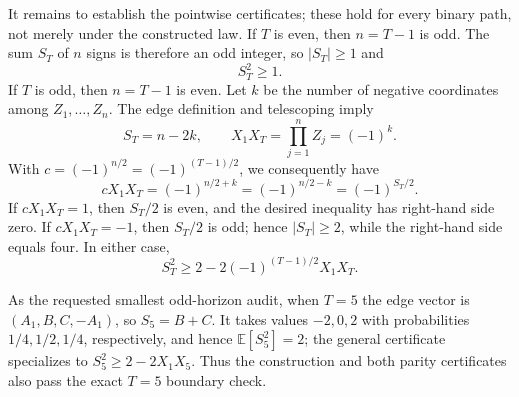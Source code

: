 It remains to establish the pointwise certificates; these hold for every binary path, not merely under the constructed law.  If \(T\) is even, then \(n=T-1\) is odd.  The sum \(S_T\) of \(n\) signs is therefore an odd integer, so \(|S_T|\ge1\) and
\[
 S_T^2\ge1.
\]
If \(T\) is odd, then \(n=T-1\) is even.  Let \(k\) be the number of negative coordinates among \(Z_1,\ldots,Z_n\).  The edge definition and telescoping imply
\[
 S_T=n-2k,
 \qquad
 X_1X_T=\prod_{j=1}^{n}Z_j=(-1)^k.
\]
With \(c=(-1)^{n/2}=(-1)^{(T-1)/2}\), we consequently have
\[
 cX_1X_T=(-1)^{n/2+k}=(-1)^{n/2-k}=(-1)^{S_T/2}.
\]
If \(cX_1X_T=1\), then \(S_T/2\) is even, and the desired inequality has right-hand side zero.  If \(cX_1X_T=-1\), then \(S_T/2\) is odd; hence \(|S_T|\ge2\), while the right-hand side equals four.  In either case,
\[
 S_T^2\ge 2-2(-1)^{(T-1)/2}X_1X_T.
\]

As the requested smallest odd-horizon audit, when \(T=5\) the edge vector is \((A_1,B,C,-A_1)\), so \(S_5=B+C\).  It takes values \(-2,0,2\) with probabilities \(1/4,1/2,1/4\), respectively, and hence \(\mathbb E[S_5^2]=2\); the general certificate specializes to \(S_5^2\ge2-2X_1X_5\).  Thus the construction and both parity certificates also pass the exact \(T=5\) boundary check.
